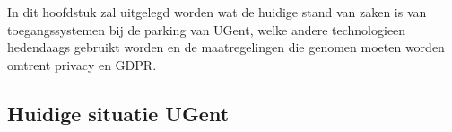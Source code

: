 \chapter{}
\label{ch:stand-van-zaken}






In dit hoofdstuk zal uitgelegd worden wat de huidige stand van zaken is van toegangssystemen bij de parking van UGent, welke andere technologieen hedendaags gebruikt worden en de maatregelingen die genomen moeten worden omtrent privacy en GDPR.

\section{Huidige situatie UGent}

